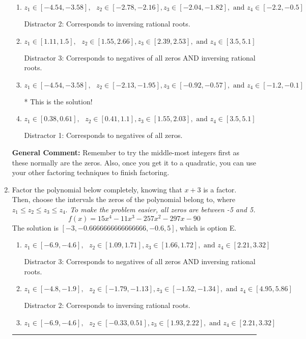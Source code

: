\documentclass{extbook}[14pt]
\newcommand{\litem}[1]{\item #1

\rule{\textwidth}{0.4pt}}
\begin{document}
\begin{enumerate}
{\begin{enumerate}[label=\Alph*.]
 Distractor 4: Corresponds to moving factors from one rational to another.
\item \( z_1 \in [-4.54, -3.58], \text{   }  z_2 \in [-2.78, -2.16], z_3 \in [-2.04, -1.82], \text{   and   } z_4 \in [-2.2, -0.5] \)

 Distractor 2: Corresponds to inversing rational roots.
\item \( z_1 \in [1.11, 1.5], \text{   }  z_2 \in [1.55, 2.66], z_3 \in [2.39, 2.53], \text{   and   } z_4 \in [3.5, 5.1] \)

 Distractor 3: Corresponds to negatives of all zeros AND inversing rational roots.
\item \( z_1 \in [-4.54, -3.58], \text{   }  z_2 \in [-2.13, -1.95], z_3 \in [-0.92, -0.57], \text{   and   } z_4 \in [-1.2, -0.1] \)

* This is the solution!
\item \( z_1 \in [0.38, 0.61], \text{   }  z_2 \in [0.41, 1.1], z_3 \in [1.55, 2.03], \text{   and   } z_4 \in [3.5, 5.1] \)

 Distractor 1: Corresponds to negatives of all zeros.
\end{enumerate}

\textbf{General Comment:} Remember to try the middle-most integers first as these normally are the zeros. Also, once you get it to a quadratic, you can use your other factoring techniques to finish factoring.
}
\litem{
Factor the polynomial below completely, knowing that $x+3$ is a factor. Then, choose the intervals the zeros of the polynomial belong to, where $z_1 \leq z_2 \leq z_3 \leq z_4$. \textit{To make the problem easier, all zeros are between -5 and 5.}
\[ f(x) = 15x^{4} -11 x^{3} -257 x^{2} -297 x -90 \]The solution is \( [-3, -0.6666666666666666, -0.6, 5] \), which is option E.\begin{enumerate}[label=\Alph*.]
\item \( z_1 \in [-6.9, -4.6], \text{   }  z_2 \in [1.09, 1.71], z_3 \in [1.66, 1.72], \text{   and   } z_4 \in [2.21, 3.32] \)

 Distractor 3: Corresponds to negatives of all zeros AND inversing rational roots.
\item \( z_1 \in [-4.8, -1.9], \text{   }  z_2 \in [-1.79, -1.13], z_3 \in [-1.52, -1.34], \text{   and   } z_4 \in [4.95, 5.86] \)

 Distractor 2: Corresponds to inversing rational roots.
\item \( z_1 \in [-6.9, -4.6], \text{   }  z_2 \in [-0.33, 0.51], z_3 \in [1.93, 2.22], \text{   and   } z_4 \in [2.21, 3.32] \)


\end{enumerate}}
\end{enumerate}
\end{document}
